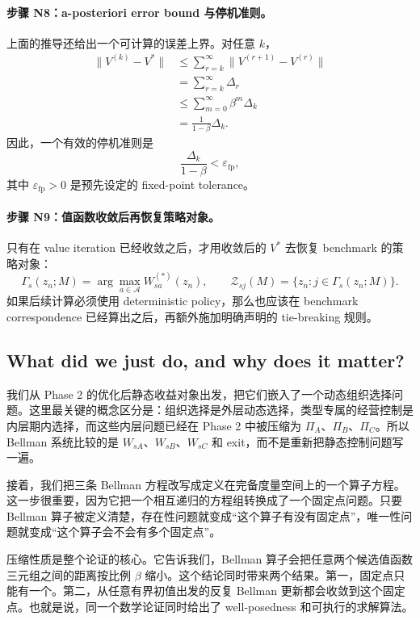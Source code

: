 \paragraph{步骤 N8：a-posteriori error bound 与停机准则。}
上面的推导还给出一个可计算的误差上界。对任意 $k$，
\begin{align*}
\|V^{(k)}-V^*\|
&\le
\sum_{r=k}^{\infty}\|V^{(r+1)}-V^{(r)}\|\\
&=
\sum_{r=k}^{\infty}\Delta_r\\
&\le
\sum_{m=0}^{\infty}\beta^m\Delta_k\\
&=
\frac{1}{1-\beta}\Delta_k.
\end{align*}
因此，一个有效的停机准则是
\[
\frac{\Delta_k}{1-\beta}<\varepsilon_{\mathrm{fp}},
\]
其中 $\varepsilon_{\mathrm{fp}}>0$ 是预先设定的 fixed-point tolerance。

\paragraph{步骤 N9：值函数收敛后再恢复策略对象。}
只有在 value iteration 已经收敛之后，才用收敛后的 $V^*$ 去恢复 benchmark 的策略对象：
\[
\Gamma_s(z_n;M)=\arg\max_{a\in\mathcal A}W_{sa}^{(*)}(z_n),
\qquad
\mathcal Z_{sj}(M)=\{z_n:j\in\Gamma_s(z_n;M)\}.
\]
如果后续计算必须使用 deterministic policy，那么也应该在 benchmark correspondence 已经算出之后，再额外施加明确声明的 tie-breaking 规则。

\subsection{What did we just do, and why does it matter?}

我们从 Phase 2 的优化后静态收益对象出发，把它们嵌入了一个动态组织选择问题。这里最关键的概念区分是：组织选择是外层动态选择，类型专属的经营控制是内层期内选择，而这些内层问题已经在 Phase 2 中被压缩为 $\Pi_A$、$\Pi_B$、$\Pi_C$。所以 Bellman 系统比较的是 $W_{sA}$、$W_{sB}$、$W_{sC}$ 和 exit，而不是重新把静态控制问题写一遍。

接着，我们把三条 Bellman 方程改写成定义在完备度量空间上的一个算子方程。这一步很重要，因为它把一个相互递归的方程组转换成了一个固定点问题。只要 Bellman 算子被定义清楚，存在性问题就变成“这个算子有没有固定点”，唯一性问题就变成“这个算子会不会有多个固定点”。

压缩性质是整个论证的核心。它告诉我们，Bellman 算子会把任意两个候选值函数三元组之间的距离按比例 $\beta$ 缩小。这个结论同时带来两个结果。第一，固定点只能有一个。第二，从任意有界初值出发的反复 Bellman 更新都会收敛到这个固定点。也就是说，同一个数学论证同时给出了 well-posedness 和可执行的求解算法。

